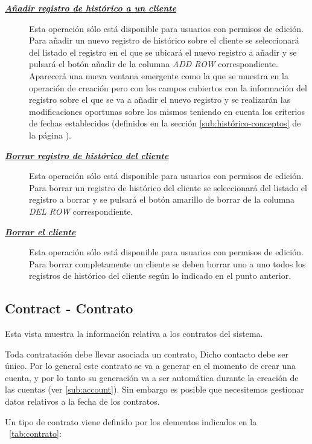 \begin{description}
\item[\underline{\textsl{\textbf{Añadir registro de histórico a un cliente}}}] Esta operación sólo está disponible para usuarios con permisos de edición.
Para añadir un nuevo registro de histórico sobre el cliente se seleccionará del listado el registro en el que se ubicará el nuevo registro a añadir y se pulsará el botón añadir de la columna \textit{ADD ROW} correspondiente. Aparecerá una nueva ventana emergente como la que se muestra en la operación de creación pero con los campos cubiertos con la información del registro sobre el que se va a añadir el nuevo registro y se realizarán las modificaciones oportunas sobre los mismos teniendo en cuenta los criterios de fechas establecidos (definidos en la sección \ref{sub:histórico-conceptos} de la página \pageref{sub:histórico-conceptos}).


\item[\underline{\textsl{\textbf{Borrar registro de histórico del cliente }}}] Esta operación sólo está disponible para usuarios con permisos de edición.
Para borrar un registro de histórico del cliente se seleccionará del listado el registro a borrar y se pulsará el botón amarillo de borrar de la columna \textit{DEL ROW} correspondiente.

\item[\underline{\textsl{\textbf{Borrar el cliente}}}]
Esta operación sólo está disponible para usuarios con permisos de edición.
Para borrar completamente un cliente se deben borrar uno a uno todos los registros de histórico del cliente según lo indicado en el punto anterior.
\end{description}


\subsection{Contract - Contrato}
\label{sub:contract}


Esta vista muestra la información relativa a los contratos del sistema.

Toda contratación debe llevar asociada un contrato, Dicho contacto debe ser único. Por lo general este contrato se va a generar en el momento de crear una cuenta, y por lo tanto su generación va a ser automática durante la creación de las cuentas (ver \ref{sub:account}). Sin embargo es posible que necesitemos gestionar datos relativos a la fecha de los contratos.

Un tipo de contrato viene definido por los elementos indicados en la \tablename~\ref{tab:contrato}:



